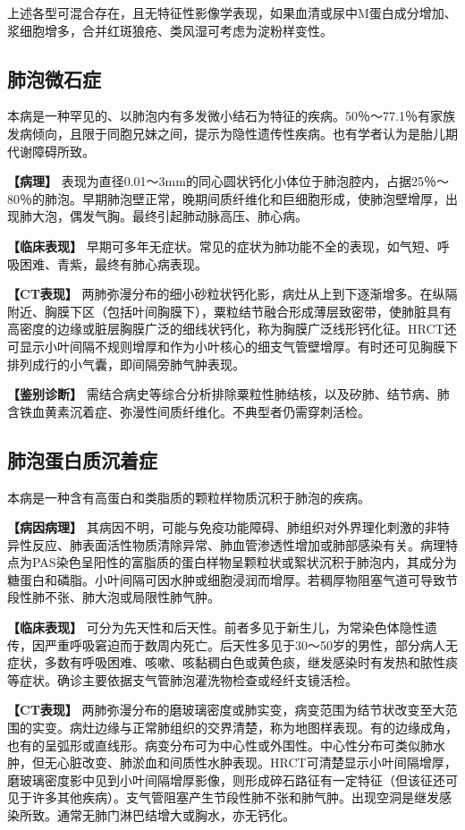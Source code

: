 上述各型可混合存在，且无特征性影像学表现，如果血清或尿中M蛋白成分增加、浆细胞增多，合并红斑狼疮、类风湿可考虑为淀粉样变性。

\subsection{肺泡微石症}

本病是一种罕见的、以肺泡内有多发微小结石为特征的疾病。50％～77.1％有家族发病倾向，且限于同胞兄妹之间，提示为隐性遗传性疾病。也有学者认为是胎儿期代谢障碍所致。

\textbf{【病理】}
表现为直径0.01～3mm的同心圆状钙化小体位于肺泡腔内，占据25％～80％的肺泡。早期肺泡壁正常，晚期间质纤维化和巨细胞形成，使肺泡壁增厚，出现肺大泡，偶发气胸。最终引起肺动脉高压、肺心病。

\textbf{【临床表现】}
早期可多年无症状。常见的症状为肺功能不全的表现，如气短、呼吸困难、青紫，最终有肺心病表现。

\textbf{【CT表现】}
两肺弥漫分布的细小砂粒状钙化影，病灶从上到下逐渐增多。在纵隔附近、胸膜下区（包括叶间胸膜下），粟粒结节融合形成薄层致密带，使肺脏具有高密度的边缘或脏层胸膜广泛的细线状钙化，称为胸膜广泛线形钙化征。HRCT还可显示小叶间隔不规则增厚和作为小叶核心的细支气管壁增厚。有时还可见胸膜下排列成行的小气囊，即间隔旁肺气肿表现。

\textbf{【鉴别诊断】}
需结合病史等综合分析排除粟粒性肺结核，以及矽肺、结节病、肺含铁血黄素沉着症、弥漫性间质纤维化。不典型者仍需穿刺活检。

\subsection{肺泡蛋白质沉着症}

本病是一种含有高蛋白和类脂质的颗粒样物质沉积于肺泡的疾病。

\textbf{【病因病理】}
其病因不明，可能与免疫功能障碍、肺组织对外界理化刺激的非特异性反应、肺表面活性物质清除异常、肺血管渗透性增加或肺部感染有关。病理特点为PAS染色呈阳性的富脂质的蛋白样物呈颗粒状或絮状沉积于肺泡内，其成分为糖蛋白和磷脂。小叶间隔可因水肿或细胞浸润而增厚。若稠厚物阻塞气道可导致节段性肺不张、肺大泡或局限性肺气肿。

\textbf{【临床表现】}
可分为先天性和后天性。前者多见于新生儿，为常染色体隐性遗传，因严重呼吸窘迫而于数周内死亡。后天性多见于30～50岁的男性，部分病人无症状，多数有呼吸困难、咳嗽、咳黏稠白色或黄色痰，继发感染时有发热和脓性痰等症状。确诊主要依据支气管肺泡灌洗物检查或经纤支镜活检。

\textbf{【CT表现】}
两肺弥漫分布的磨玻璃密度或肺实变，病变范围为结节状改变至大范围的实变。病灶边缘与正常肺组织的交界清楚，称为地图样表现。有的边缘成角，也有的呈弧形或直线形。病变分布可为中心性或外围性。中心性分布可类似肺水肿，但无心脏改变、肺淤血和间质性水肿表现。HRCT可清楚显示小叶间隔增厚，磨玻璃密度影中见到小叶间隔增厚影像，则形成碎石路征有一定特征（但该征还可见于许多其他疾病）。支气管阻塞产生节段性肺不张和肺气肿。出现空洞是继发感染所致。通常无肺门淋巴结增大或胸水，亦无钙化。

